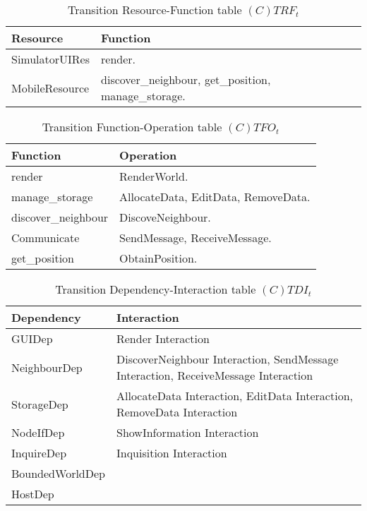 \begin{table}[H]
	\centering
	\begin{tabular}{|p{4cm}|p{8cm}|}
			\hline
			\textbf{Resource} & \textbf{Function} \\
			\hline
			SimulatorUIRes & render. \\
			\hline
			MobileResource & discover\_neighbour, get\_position, manage\_storage. \\
			\hline
		\end{tabular}
	\caption{Transition Resource-Function table $(C)TRF_t$}
	\label{tab:ctrft}
\end{table}

\begin{table}[H]
	\centering
	\begin{tabular}{|p{4cm}|p{8cm}|}
			\hline
			\textbf{Function} & \textbf{Operation} \\
			\hline
			render & RenderWorld. \\
			\hline
			manage\_storage & AllocateData, EditData, RemoveData. \\
			\hline
			discover\_neighbour & DiscoveNeighbour. \\
			\hline
			Communicate & SendMessage, ReceiveMessage. \\
			\hline
			get\_position & ObtainPosition. \\
			\hline
		\end{tabular}
	\caption{Transition Function-Operation table $(C)TFO_t$}
	\label{tab:ctfot}
\end{table}

\begin{table}[H]
	\centering
	\begin{tabular}{|p{4cm}|p{8cm}|}
			\hline
			\textbf{Dependency} & \textbf{Interaction} \\
			\hline
			GUIDep & Render Interaction \\
			\hline
      NeighbourDep & DiscoverNeighbour Interaction, SendMessage Interaction,
      ReceiveMessage Interaction \\
			\hline
			StorageDep & AllocateData Interaction, EditData Interaction, RemoveData Interaction \\
			\hline
			NodeIfDep & ShowInformation Interaction \\
			\hline
			InquireDep & Inquisition Interaction\\
			\hline
			BoundedWorldDep & \\
			\hline
			HostDep & \\
			\hline
		\end{tabular}
	\caption{Transition Dependency-Interaction table $(C)TDI_t$}
	\label{tab:ctdit}
\end{table}

